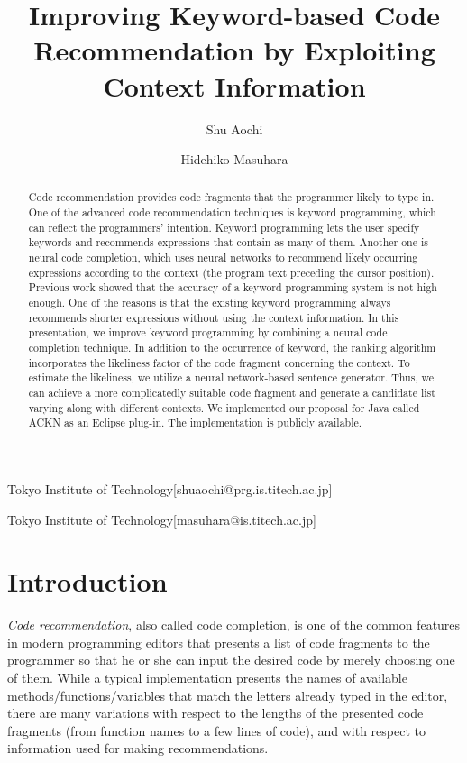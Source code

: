 \documentclass[PRO,english]{ipsj}
\begin{document}
\title{Improving Keyword-based Code Recommendation by Exploiting Context Information}
\author{Shu Aochi}{Tokyo Institute of Technology}[shuaochi@prg.is.titech.ac.jp]
\author{Hidehiko Masuhara}{Tokyo Institute of Technology}[masuhara@is.titech.ac.jp]

\begin{abstract}
Code recommendation provides code fragments that the programmer likely to type in. One of the advanced code recommendation techniques is keyword programming, which can reflect the programmers' intention. Keyword programming lets the user specify keywords and recommends expressions that contain as many of them. Another one is neural code completion, which uses neural networks to recommend likely occurring expressions according to the context (the program text preceding the cursor position). Previous work showed that the accuracy of a keyword programming system is not high enough. One of the reasons is that the existing keyword programming always recommends shorter expressions without using the context information. In this presentation, we improve keyword programming by combining a neural code completion technique. In addition to the occurrence of keyword, the ranking algorithm incorporates the likeliness factor of the code fragment concerning the context. To estimate the likeliness, we utilize a neural network-based sentence generator. Thus, we can achieve a more complicatedly suitable code fragment and generate a candidate list varying along with different contexts. We implemented our proposal for Java called ACKN as an Eclipse plug-in. The implementation is publicly available.
\end{abstract}

\maketitle

\section{Introduction}

\emph{Code recommendation}, also called code completion, is one of the common features in modern programming editors that presents a list of code fragments to the programmer so that he or she can input the desired code by merely choosing one of them.
While a typical implementation presents the names of available methods/functions/variables that match the letters already typed in the editor, 
there are many variations with respect to the lengths of the presented code fragments (from function names to a few lines of code), and with respect to information used for making recommendations.
\end{document}
